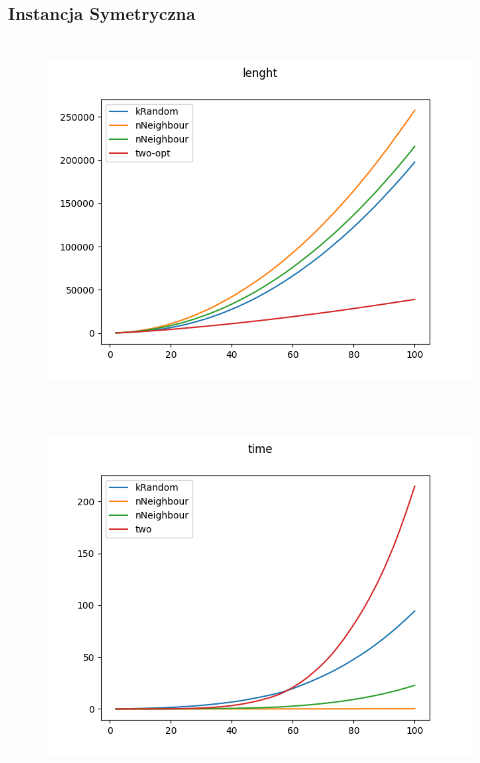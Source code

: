 \documentclass[11pt]{article}
\begin{document}
\subsubsection{Instancja Symetryczna }
            \begin{center}
            \begin{figure}[H]

                \\ \includegraphics[scale=0.6]{images/lenght_sym.png}\

            \end{figure}
            \end{center}
            \begin{center}
            \begin{figure}[H]

                \\ \includegraphics[scale=0.6]{images/time_sym.png}\

            \end{figure}
            \end{center}
\end{document}
